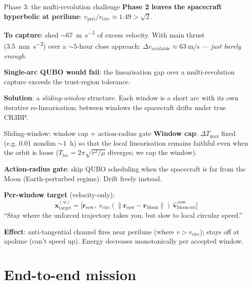 \documentclass[10pt,aspectratio=169]{beamer}
\newcommand{\bvec}[1]{\bm{#1}}
\newcommand{\xvec}{\bvec{x}}
\newcommand{\rvec}{\bvec{r}}
\begin{document}
\begin{frame}{Phase 3: the multi-revolution challenge}
\textbf{Phase 2 leaves the spacecraft hyperbolic at perilune}:
$v_\mathrm{peri}/v_\mathrm{circ} \approx 1.49 > \sqrt{2}$.

\medskip
\textbf{To capture}: shed $\sim$\SI{67}{\meter\per\second} of
excess velocity. With main thrust
(\SI{3.5}{\milli\meter\per\second\squared}) over a
$\sim 5$-hour close approach:
$\Delta v_\mathrm{available} \approx \SI{63}{\meter\per\second}$ ---
\emph{just barely enough}.

\medskip
\textbf{Single-arc QUBO would fail}: the linearisation gap over a
multi-revolution capture exceeds the trust-region tolerance.

\medskip
\textbf{Solution}: a \emph{sliding-window} structure. Each window
is a short arc with its own iterative re-linearisation; between
windows the spacecraft drifts under true CR3BP.
\end{frame}

\begin{frame}{Sliding-window: window cap + action-radius gate}
\textbf{Window cap}: $\Delta T_\mathrm{max}$ fixed (e.g.
\SI{0.01}{} nondim $\sim 1$~h) so that the local linearisation
remains faithful even when the orbit is loose
($T_\mathrm{loc} = 2\pi\sqrt{r^3/\mu}$ diverges; we cap the
window).

\medskip
\textbf{Action-radius gate}: skip QUBO scheduling when the
spacecraft is far from the Moon (Earth-perturbed regime). Drift
freely instead.

\medskip
\textbf{Per-window target} (velocity-only):
\[
  \xvec_\mathrm{target}^{(w)} = \big[\rvec_\mathrm{eow},\;
    v_\mathrm{circ}(\|\rvec_\mathrm{eow} - \rvec_\mathrm{Moon}\|)
    \,\hat{\bvec{v}}_\mathrm{Moon\text{-}rel}^{\,\mathrm{eow}}\big]
\]
``Stay where the unforced trajectory takes you, but slow to
local circular speed.''

\medskip
\textbf{Effect}: anti-tangential channel fires near perilune
(where $v > v_\mathrm{circ}$); stays off at apolune
(can't speed up). Energy decreases monotonically per accepted
window.
\end{frame}

\section{End-to-end mission}
\end{document}
